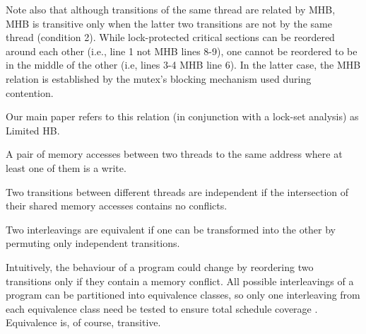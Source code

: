 Note also that although transitions of the same thread are related by MHB,
MHB is transitive only when the latter two transitions are not by the same thread (condition 2).
While lock-protected critical sections can be reordered around each other (i.e., line 1 not MHB lines 8-9),
one cannot be reordered to be in the middle of the other (i.e, lines 3-4 MHB line 6).
In the latter case, the MHB relation is established by the mutex's blocking mechanism used during contention.

Our main paper refers to this relation (in conjunction with a lock-set analysis) as Limited HB.

\begin{definition}
A pair of memory accesses between two threads to the same address where at least one of them is a write.
\end{definition}


\begin{definition}
Two transitions between different threads are independent if the intersection of their shared memory accesses contains no conflicts.
\end{definition}

\begin{definition}
Two interleavings are equivalent if one can be transformed into the other by permuting only independent transitions.
\end{definition}

Intuitively, the behaviour of a program could change by reordering two transitions only if they contain a memory conflict.
All possible interleavings of a program can be partitioned into equivalence classes,
so only one interleaving from each equivalence class need be tested to ensure total schedule coverage \cite{mazurkiewicz}.
Equivalence is, of course, transitive.


